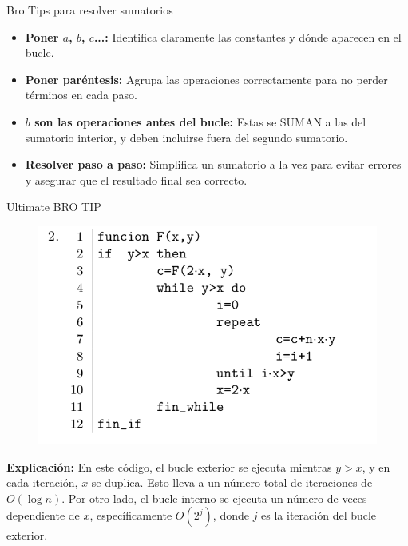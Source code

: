 \documentclass[aspectratio=169]{beamer}
\begin{document}
\begin{frame}{Bro Tips para resolver sumatorios}
\begin{itemize}
    \item \textbf{Poner \(a\), \(b\), \(c\)...:} Identifica claramente las constantes y dónde aparecen en el bucle.
    \item \textbf{Poner paréntesis:} Agrupa las operaciones correctamente para no perder términos en cada paso.
    \item \textbf{\(b\) son las operaciones antes del bucle:} Estas se SUMAN a las del sumatorio interior, y deben incluirse fuera del segundo sumatorio.
    \item \textbf{Resolver paso a paso:} Simplifica un sumatorio a la vez para evitar errores y asegurar que el resultado final sea correcto.
\end{itemize}
\end{frame}

\begin{frame}{Ultimate BRO TIP }
\begin{figure}
    \centering
    \includegraphics[width=0.5\linewidth]{sumatorio-ejercicio.png}
    \label{fig:enter-label}
\end{figure}
\textbf{Explicación:} 
En este código, el bucle exterior se ejecuta mientras $y > x$, y en cada iteración, $x$ se duplica. Esto lleva a un número total de iteraciones de $O(\log n)$. Por otro lado, el bucle interno se ejecuta un número de veces dependiente de $x$, específicamente $O(2^j)$, donde $j$ es la iteración del bucle exterior.
\end{frame}
\end{document}
